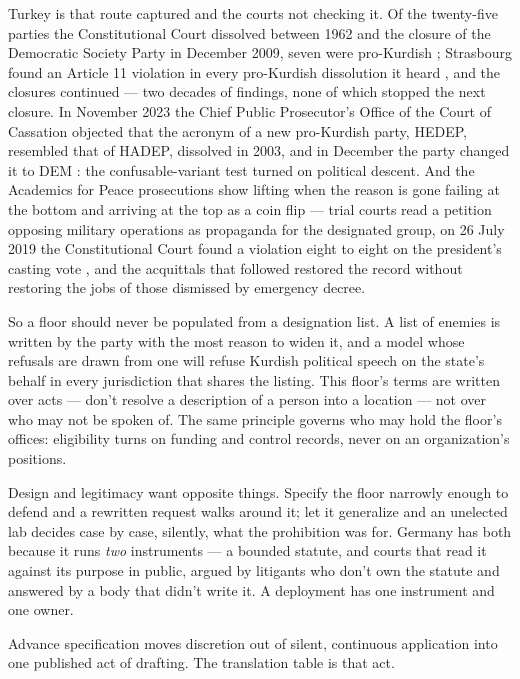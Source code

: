 Turkey is that route captured and the courts not checking it. Of the twenty-five parties the Constitutional Court dissolved between 1962 and the closure of the Democratic Society Party in December 2009, seven were pro-Kurdish \autocite{HRW2009DTP,Gungordu2023HDP}; Strasbourg found an Article 11 violation in every pro-Kurdish dissolution it heard \autocite{Article19_2023HDP}, and the closures continued — two decades of findings, none of which stopped the next closure. In November 2023 the Chief Public Prosecutor's Office of the Court of Cassation objected that the acronym of a new pro-Kurdish party, HEDEP, resembled that of HADEP, dissolved in 2003, and in December the party changed it to DEM \autocite{Duvar2023HEDEP}: the confusable-variant test turned on political descent. And the Academics for Peace prosecutions show lifting when the reason is gone failing at the bottom and arriving at the top as a coin flip — trial courts read a petition opposing military operations as propaganda for the designated group, on 26 July 2019 the Constitutional Court found a violation eight to eight on the president's casting vote \autocite{AYM2019Ustel,Bianet2019AcademicsForPeace}, and the acquittals that followed restored the record without restoring the jobs of those dismissed by emergency decree.

So a floor should never be populated from a designation list. A list of enemies is written by the party with the most reason to widen it, and a model whose refusals are drawn from one will refuse Kurdish political speech on the state's behalf in every jurisdiction that shares the listing. This floor's terms are written over acts — don't resolve a description of a person into a location — not over who may not be spoken of. The same principle governs who may hold the floor's offices: eligibility turns on funding and control records, never on an organization's positions.


Design and legitimacy want opposite things. Specify the floor narrowly enough to defend and a rewritten request walks around it; let it generalize and an unelected lab decides case by case, silently, what the prohibition was for. Germany has both because it runs \emph{two} instruments — a bounded statute, and courts that read it against its purpose in public, argued by litigants who don't own the statute and answered by a body that didn't write it. A deployment has one instrument and one owner.

Advance specification moves discretion out of silent, continuous application into one published act of drafting. The translation table is that act.

